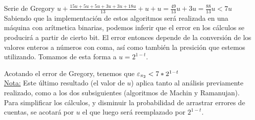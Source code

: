\begin{subsubsection}{Serie de Gregory}
	$u + \frac{15u + 5u + 5u + 3u + 3u + 18u}{13} + u + u = \frac{49}{13}u + 3u = \frac{88}{13}u < 7u$\\

	Sabiendo que la implementación de estos algoritmos será realizada en una máquina con arítmetica binarias, podemos inferir que el error en los cálculos se producirá a partir de cierto bit. El error entonces depende de la conversión de los valores enteros a números con coma, así como también la presición que estemos utilizando. Tomamos de esta forma a $u=2^{1-t}$.
	
	Acotando el error de Gregory, tenemos que $\varepsilon _{\pi_2} < 7*2^{1-t}$\\
	
	\underline{Nota:} Este último resultado (el valor de $u$) aplica tanto al análisis previamente realizado, como a los dos subsiguientes (algoritmos de Machin y Ramanujan). Para simplificar los cálculos, y disminuir la probabilidad de arrastrar errores de cuentas, se acotará por $u$ el que luego será reemplazado por $2^{1-t}$.
\end{subsubsection}